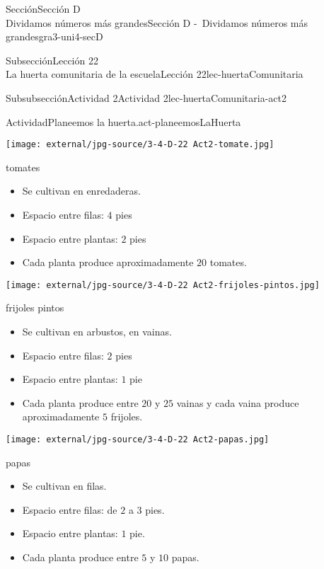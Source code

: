 \begin{sectionptx}{Sección}{{\Large Sección D\\}Dividamos números más grandes}{}{Sección D -~Dividamos números más grandes}{}{}{gra3-uni4-secD}
\begin{subsectionptx}{Subsección}{{\normalsize Lección 22\\[-0.05cm]}La huerta comunitaria de la escuela}{}{Lección 22}{}{}{lec-huertaComunitaria}
\begin{subsubsectionptx}{Subsubsección}{Actividad 2}{}{Actividad 2}{}{}{lec-huertaComunitaria-act2}
\begin{activity}{Actividad}{Planeemos la huerta.}{act-planeemosLaHuerta}
\begin{sidebyside}{2}{0.025}{0.025}{0.05}
\begin{sbspanel}{0.45}
\begin{itemize}[label=\textbullet]
\end{itemize}
\end{sbspanel}%
\begin{sbspanel}{0.45}%
\texttt{[image: external/jpg-source/3-4-D-22 Act2-tomate.jpg]}
%
\par
tomates%
%
\begin{itemize}[label=\textbullet]
\item{}Se cultivan en enredaderas.%
\item{}Espacio entre filas: \(4\) pies%
\item{}Espacio entre plantas: \(2\) pies%
\item{}Cada planta produce aproximadamente \(20\) tomates.%
\end{itemize}
\end{sbspanel}%
\end{sidebyside}%
\begin{sidebyside}{2}{0.025}{0.025}{0.05}%
\begin{sbspanel}{0.45}%
\texttt{[image: external/jpg-source/3-4-D-22 Act2-frijoles-pintos.jpg]}
%
\par
frijoles pintos%
%
\begin{itemize}[label=\textbullet]
\item{}Se cultivan en arbustos, en vainas.%
\item{}Espacio entre filas: \(2\) pies%
\item{}Espacio entre plantas: \(1\) pie%
\item{}Cada planta produce entre \(20\) y \(25\) vainas y cada vaina produce aproximadamente \(5\) frijoles.%
\end{itemize}
\end{sbspanel}%
\begin{sbspanel}{0.45}%
\texttt{[image: external/jpg-source/3-4-D-22 Act2-papas.jpg]}
%
\par
papas%
%
\begin{itemize}[label=\textbullet]
\item{}Se cultivan en filas.%
\item{}Espacio entre filas: de \(2\) a \(3\) pies.%
\item{}Espacio entre plantas: \(1\) pie.%
\item{}Cada planta produce entre \(5\) y \(10\) papas.%
\end{itemize}
\end{sbspanel}%
\end{sidebyside}%
\end{activity}%

\end{subsubsectionptx}
\end{subsectionptx}
\end{sectionptx}
